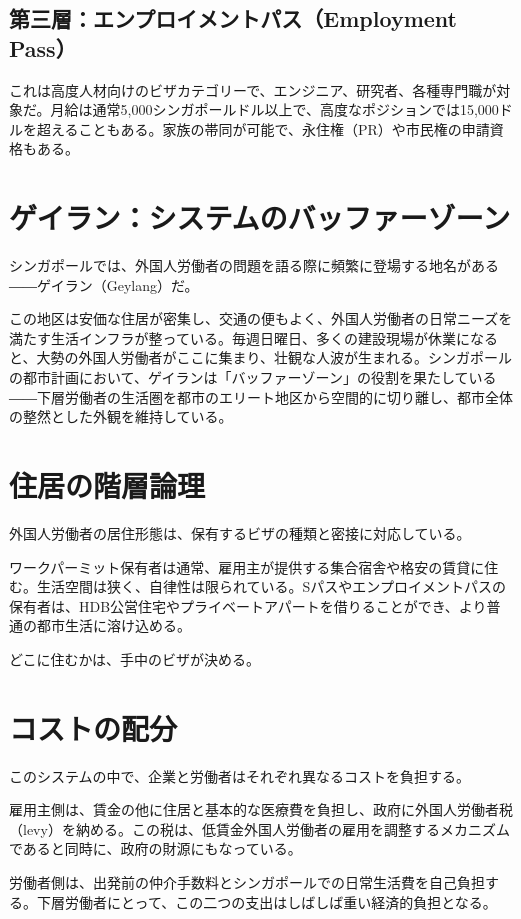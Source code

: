 \subsection*{第三層：エンプロイメントパス（Employment Pass）}

これは高度人材向けのビザカテゴリーで、エンジニア、研究者、各種専門職が対象だ。月給は通常5,000シンガポールドル以上で、高度なポジションでは15,000ドルを超えることもある。家族の帯同が可能で、永住権（PR）や市民権の申請資格もある。

\section{ゲイラン：システムのバッファーゾーン}

シンガポールでは、外国人労働者の問題を語る際に頻繁に登場する地名がある――ゲイラン（Geylang）だ。

この地区は安価な住居が密集し、交通の便もよく、外国人労働者の日常ニーズを満たす生活インフラが整っている。毎週日曜日、多くの建設現場が休業になると、大勢の外国人労働者がここに集まり、壮観な人波が生まれる。シンガポールの都市計画において、ゲイランは「バッファーゾーン」の役割を果たしている――下層労働者の生活圏を都市のエリート地区から空間的に切り離し、都市全体の整然とした外観を維持している。

\section{住居の階層論理}

外国人労働者の居住形態は、保有するビザの種類と密接に対応している。

ワークパーミット保有者は通常、雇用主が提供する集合宿舎や格安の賃貸に住む。生活空間は狭く、自律性は限られている。Sパスやエンプロイメントパスの保有者は、HDB公営住宅やプライベートアパートを借りることができ、より普通の都市生活に溶け込める。

どこに住むかは、手中のビザが決める。

\section{コストの配分}

このシステムの中で、企業と労働者はそれぞれ異なるコストを負担する。

雇用主側は、賃金の他に住居と基本的な医療費を負担し、政府に外国人労働者税（levy）を納める。この税は、低賃金外国人労働者の雇用を調整するメカニズムであると同時に、政府の財源にもなっている。

労働者側は、出発前の仲介手数料とシンガポールでの日常生活費を自己負担する。下層労働者にとって、この二つの支出はしばしば重い経済的負担となる。

